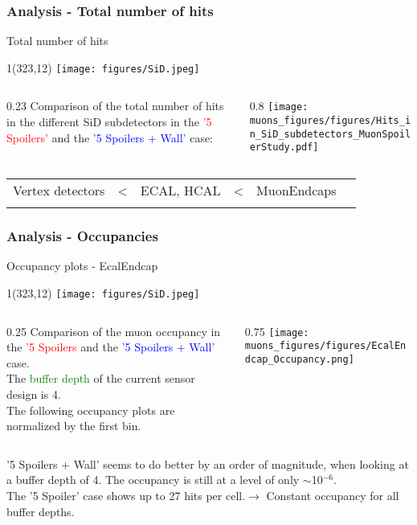 \documentclass[xcolor={dvipsnames}]{beamer}
\newcommand{\sidlogo}{
  \setlength{\TPHorizModule}{1pt}
  \setlength{\TPVertModule}{1pt}
  \begin{textblock}{1}(323,12)
   \texttt{[image: figures/SiD.jpeg]}
  \end{textblock}
  }
\begin{document}
\subsubsection{Analysis - Total number of hits}
\begin{frame}{Total number of hits}
\sidlogo
\begin{columns}
 \begin{column}{0.23\textwidth}
 \small
  Comparison of the total number of hits in the different SiD subdetectors in the \textcolor{red}{'5 Spoilers'} and the \textcolor{blue}{'5 Spoilers + Wall'} case:
 \end{column}
 \begin{column}{0.8\textwidth}
\texttt{[image: muons\_figures/figures/Hits\_in\_SiD\_subdetectors\_MuonSpoilerStudy.pdf]}
 \end{column}
\end{columns}
\begin{center}
\begin{tabular}{@{}p{}p{}p{}p{}p{}p{}@{}}
 \centering Vertex detectors & < & \centering ECAL, HCAL & < & \centering MuonEndcaps & \\
  \centering{\scriptsize Smallest effective detector area} & &  \centering{\scriptsize Particle showers} & &  \centering{\scriptsize Biggest effective detector area}&
\end{tabular}
\end{center}
\end{frame}


\subsubsection{Analysis - Occupancies}

\begin{frame}{Occupancy plots - \small EcalEndcap}
\sidlogo
\begin{columns}
 \begin{column}{0.25\textwidth}
 \small
  Comparison of the muon occupancy in the \textcolor{red}{'5 Spoilers} and the \textcolor{blue}{'5 Spoilers + Wall'} case.\\{\small The \textcolor{green}{buffer depth} of the current sensor design is 4.}\\
  \vspace*{0.2cm}
  {\footnotesize The following occupancy plots are normalized by the first bin.}
 \end{column}
 \begin{column}{0.75\textwidth}
\texttt{[image: muons\_figures/figures/EcalEndcap\_Occupancy.png]}
\end{column}
\end{columns}
\small '5 Spoilers + Wall' seems to do better by an order of magnitude, when looking at a buffer depth of 4. The occupancy is still at a level of only $\sim$10$^{-6}$.\\
\small The '5 Spoiler' case shows up to 27 hits per cell.$\rightarrow$ Constant occupancy for all buffer depths.
\end{frame}
\end{document}
